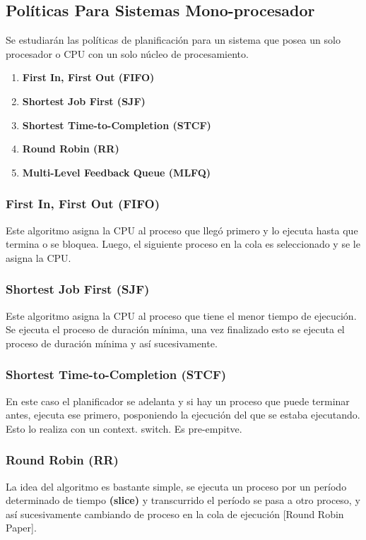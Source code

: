 \documentclass[../main.tex]{subfiles}
\begin{document}
    \subsection{Políticas Para Sistemas Mono-procesador}
        Se estudiarán las políticas de planificación para un sistema que posea un solo procesador o CPU con un solo núcleo de procesamiento.
        \begin{enumerate}
            \item \textbf{First In, First Out (FIFO)}
            \item \textbf{Shortest Job First (SJF)}
            \item \textbf{Shortest Time-to-Completion (STCF)}
            \item \textbf{Round Robin (RR)}
            \item \textbf{Multi-Level Feedback Queue (MLFQ)}
        \end{enumerate}

        \subsubsection*{First In, First Out (FIFO)}
            Este algoritmo asigna la CPU al proceso que llegó primero y lo ejecuta hasta que termina o se bloquea. Luego, el siguiente proceso en la cola es seleccionado y se le asigna la CPU.

        \subsubsection*{Shortest Job First (SJF)} 
            Este algoritmo asigna la CPU al proceso que tiene el menor tiempo de ejecución.
            Se ejecuta el proceso de duración mínima, una vez finalizado esto se ejecuta el proceso de duración mínima y así sucesivamente.

        \subsubsection*{Shortest Time-to-Completion (STCF)}
            En este caso el planificador se adelanta y si hay un proceso que puede terminar antes, ejecuta ese primero, posponiendo la ejecución del que se estaba ejecutando. Esto lo realiza con un context.
        switch. Es pre-empitve.
        \subsubsection*{Round Robin (RR)}
            La idea del algoritmo es bastante simple, se ejecuta un proceso por un período determinado de tiempo \textbf{(slice)} y transcurrido el período se pasa a otro proceso, y así sucesivamente cambiando de proceso en la cola de ejecución [Round Robin Paper].
            
\end{document}
